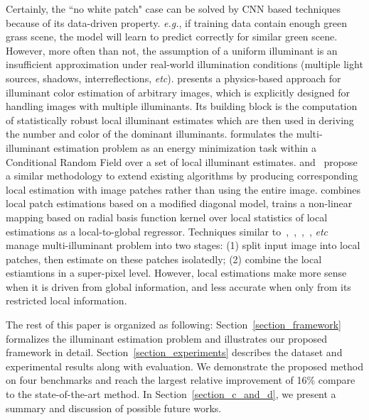 \documentclass[10pt,twocolumn,letterpaper]{article}
\begin{document}
Certainly, the ``no white patch" case can be solved by CNN based techniques because of its data-driven property.
\textit{e.g.}, if training data contain enough green grass scene,
the model will learn to predict correctly for similar green scene.
However, more often than not, the assumption of a uniform illuminant is an insufficient approximation under
real-world illumination conditions (multiple light sources, shadows, interreflections, \textit{etc}).
\cite{riess2011illuminant} presents a physics-based approach for illuminant color estimation of arbitrary images,
which is explicitly designed for handling images with multiple illuminants.
Its building block is the computation of statistically robust local illuminant estimates which
are then used in deriving the number and color of the dominant illuminants.
\cite{beigpour2014multi} formulates the multi-illuminant estimation problem as an energy minimization task within
a Conditional Random Field over a set of local illuminant estimates.
\cite{bianco2015single} and~\cite{gijsenij2012color} propose a similar methodology to extend existing algorithms
by producing corresponding local estimation with image patches rather than using the entire image.
\cite{gijsenij2012color} combines local patch estimations based on a modified diagonal model,
\cite{bianco2015single} trains a non-linear mapping based on radial basis function kernel over
local statistics of local estimations as a local-to-global regressor.
Techniques similar to~\cite{riess2011illuminant},~\cite{beigpour2014multi},~\cite{gijsenij2012color},~\cite{bianco2015single}, \textit{etc}
manage multi-illuminant problem into two stages: (1) split input image into local patches,
then estimate on these patches isolatedly; (2) combine the local estiamtions in a super-pixel level.
However, local estimations make more sense when it is driven from global information,
and less accurate when only from its restricted local information.

The rest of this paper is organized as following: Section~\ref{section_framework} formalizes the illuminant estimation problem
and illustrates our proposed framework in detail.
Section~\ref{section_experiments} describes the dataset and experimental results along with evaluation.
We demonstrate the proposed method on four benchmarks and reach the largest relative improvement of
16\%
compare to the state-of-the-art method.
In Section~\ref{section_c_and_d}, we present a summary and discussion of possible future works.
\end{document}

